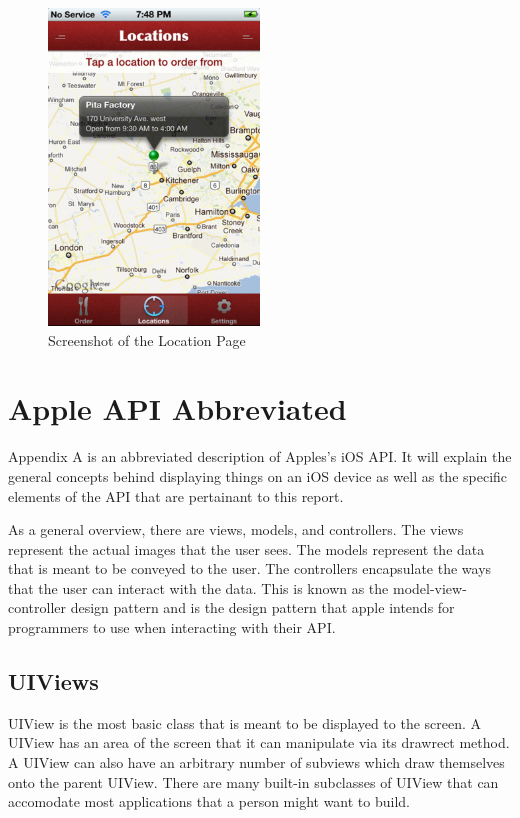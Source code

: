 \documentclass[se]{uw-wkrpt}
\begin{document}
\begin{figure}[h!]
  \caption{Screenshot of the Location Page}
  \centering
    \includegraphics[width=0.5\textwidth]{locationPage}
\end{figure}

\appendix

\section{Apple API Abbreviated}

Appendix A is an abbreviated description of Apples's iOS API. It
will explain the general concepts behind displaying things on
an iOS device as well as the specific elements of the API that
are pertainant to this report.

As a general overview, there are views, models, and controllers.
The views represent the actual images that the user sees. The models
represent the data that is meant to be conveyed to the user. The
controllers encapsulate the ways that the user can interact with
the data. This is known as the model-view-controller design pattern
and is the design pattern that apple intends for programmers to use
when interacting with their API.

\subsection{UIViews}

UIView is the most basic class that is meant to be displayed to
the screen. A UIView has an area of the screen that it can manipulate
via its drawrect method. A UIView can also have an arbitrary number of 
subviews which draw themselves onto the parent UIView. There are 
many built-in subclasses of UIView that can accomodate most 
applications that a person might want to build.
\end{document}
